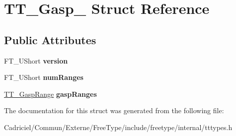 \hypertarget{struct_t_t___gasp__}{}\section{T\+T\+\_\+\+Gasp\+\_\+ Struct Reference}
\label{struct_t_t___gasp__}
\subsection*{Public Attributes}
\begin{DoxyCompactItemize}
\item 
F\+T\+\_\+\+U\+Short {\bfseries version}\hypertarget{struct_t_t___gasp___a0166777999a11a32068418ed6cf0caf8}{}\label{struct_t_t___gasp___a0166777999a11a32068418ed6cf0caf8}

\item 
F\+T\+\_\+\+U\+Short {\bfseries num\+Ranges}\hypertarget{struct_t_t___gasp___a03f6dc693ebee0fedc055ac0981ee776}{}\label{struct_t_t___gasp___a03f6dc693ebee0fedc055ac0981ee776}

\item 
\hyperlink{struct_t_t___gasp_range_rec__}{T\+T\+\_\+\+Gasp\+Range} {\bfseries gasp\+Ranges}\hypertarget{struct_t_t___gasp___a50240e84cfd7fc79ae1f2996ecb2a5d1}{}\label{struct_t_t___gasp___a50240e84cfd7fc79ae1f2996ecb2a5d1}

\end{DoxyCompactItemize}


The documentation for this struct was generated from the following file\+:\begin{DoxyCompactItemize}
\item 
Cadriciel/\+Commun/\+Externe/\+Free\+Type/include/freetype/internal/tttypes.\+h\end{DoxyCompactItemize}
